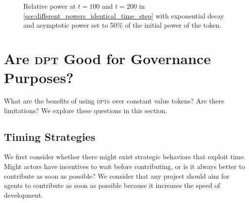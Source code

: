 \begin{figure*}[ht!]
  \centering
  \hspace*{10mm}%
  \caption{%
  	\label{fig:exponential_decay_30_50_identical_power_different_time_steps_comparison}%
    Relative power at $t=100$ and $t=200$ in \cref{sce:different_powers_identical_time_step} with exponential decay and asymptotic power set to 50\% of the initial power of the token.
  }
\end{figure*}

\section{Are \textsc{dpt} Good for Governance Purposes?}
\label{sec:dpt_philosophical_analysis}

What are the benefits of using \textsc{dpt}s over constant value tokens?
Are there limitations?
We explore these questions in this section.

\subsection{Timing Strategies}

We first consider whether there might exist strategic behaviors that exploit time.
Might actors have incentives to wait before contributing, or is it always better to contribute as soon as possible?
We consider that any project should aim for agents to contribute as soon as possible because it increases the speed of development.

